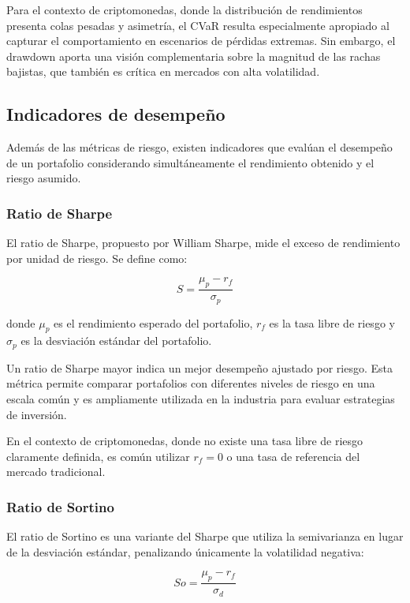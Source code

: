 \documentclass[12pt]{article}
\begin{document}
Para el contexto de criptomonedas, donde la distribución de
rendimientos presenta colas pesadas y asimetría, el CVaR resulta
especialmente apropiado al capturar el comportamiento en escenarios
de pérdidas extremas. Sin embargo, el drawdown aporta una visión
complementaria sobre la magnitud de las rachas bajistas, que también es
crítica en mercados con alta volatilidad.

\subsection{Indicadores de desempeño}

Además de las métricas de riesgo, existen indicadores que evalúan el
desempeño de un portafolio considerando simultáneamente el
rendimiento obtenido y el riesgo asumido.

\subsubsection{Ratio de Sharpe}

El ratio de Sharpe, propuesto por William Sharpe, mide el exceso de
rendimiento por unidad de riesgo. Se define como:

\begin{equation}
  S = \frac{\mu_p - r_f}{\sigma_p}
\end{equation}

donde $\mu_p$ es el rendimiento esperado del portafolio, $r_f$ es la
tasa libre de riesgo y $\sigma_p$ es la desviación estándar del
portafolio.

Un ratio de Sharpe mayor indica un mejor desempeño ajustado por
riesgo. Esta métrica permite comparar portafolios con diferentes
niveles de riesgo en una escala común y es ampliamente utilizada
en la industria para evaluar estrategias de inversión.

En el contexto de criptomonedas, donde no existe una tasa libre de
riesgo claramente definida, es común utilizar $r_f = 0$ o una
tasa de referencia del mercado tradicional.

\subsubsection{Ratio de Sortino}

El ratio de Sortino es una variante del Sharpe que utiliza la
semivarianza en lugar de la desviación estándar, penalizando
únicamente la volatilidad negativa:

\begin{equation}
  So = \frac{\mu_p - r_f}{\sigma_d}
\end{equation}
\end{document}
